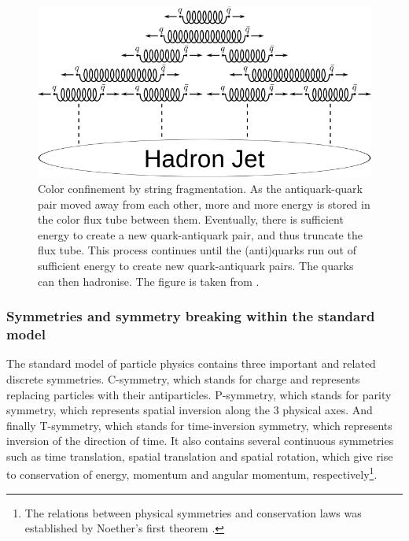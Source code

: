 \begin{figure}[h!]
    \centering
    \includegraphics[width=\textwidth]{figures/String_fragmentation.png}
    \caption{Color confinement by string fragmentation. As the antiquark-quark pair moved away from each other, more and more energy is stored in the color flux tube between them. Eventually, there is sufficient energy to create a new quark-antiquark pair, and thus truncate the flux tube. This process continues until the (anti)quarks run out of sufficient energy to create new quark-antiquark pairs. The quarks can then hadronise. The figure is taken from \cite{StringFragmentationGraphic}.}
    \label{fig:IntroStringFragmentation}
\end{figure}




\subsubsection{Symmetries and symmetry breaking within the standard model}\label{sec:IntroSymmetries}
The standard model of particle physics contains three important and related discrete symmetries\cite{}. C-symmetry, which stands for charge and represents replacing particles with their antiparticles. P-symmetry, which stands for parity symmetry, which represents spatial inversion along the 3 physical axes. And finally T-symmetry, which stands for time-inversion symmetry, which represents inversion of the direction of time. It also contains several continuous symmetries such as time translation, spatial translation and spatial rotation, which give rise to conservation of energy, momentum and angular momentum, respectively\footnote{The relations between physical symmetries and conservation laws was established by Noether's first theorem \cite{Noether1918}. }.\\

